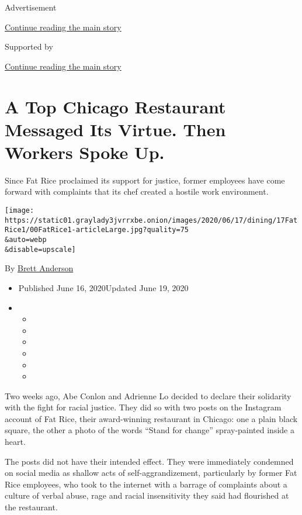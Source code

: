 Advertisement

\protect\hyperlink{after-top}{Continue reading the main story}

Supported by

\protect\hyperlink{after-sponsor}{Continue reading the main story}

\hypertarget{a-top-chicago-restaurant-messaged-its-virtue-then-workers-spoke-up}{%
\section{A Top Chicago Restaurant Messaged Its Virtue. Then Workers
Spoke
Up.}\label{a-top-chicago-restaurant-messaged-its-virtue-then-workers-spoke-up}}

Since Fat Rice proclaimed its support for justice, former employees have
come forward with complaints that its chef created a hostile work
environment.

\texttt{[image: https://static01.graylady3jvrrxbe.onion/images/2020/06/17/dining/17FatRice1/00FatRice1-articleLarge.jpg?quality=75\\\&auto=webp\\\&disable=upscale]}

By \href{https://www.nytimes3xbfgragh.onion/by/brett-anderson}{Brett
Anderson}

\begin{itemize}
\item
  Published June 16, 2020Updated June 19, 2020
\item
  \begin{itemize}
  \item
  \item
  \item
  \item
  \item
  \item
  \end{itemize}
\end{itemize}

Two weeks ago, Abe Conlon and Adrienne Lo decided to declare their
solidarity with the fight for racial justice. They did so with two posts
on the Instagram account of Fat Rice, their award-winning restaurant in
Chicago: one a plain black square, the other a photo of the words
``Stand for change'' spray-painted inside a heart.

The posts did not have their intended effect. They were immediately
condemned on social media as shallow acts of self-aggrandizement,
particularly by former Fat Rice employees, who took to the internet with
a barrage of complaints about a culture of verbal abuse, rage and racial
insensitivity they said had flourished at the restaurant.

